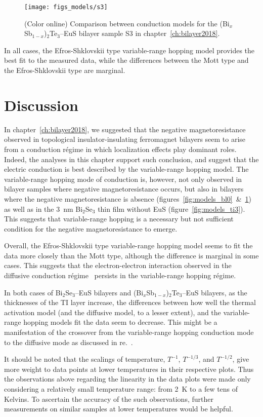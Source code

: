%
\begin{figure}[ht]%
    \centering%
    \texttt{[image: figs\_models/s3]}%
    \caption[Conduction model comparison: (Bi$_x$Sb$_{1-x}$)$_2$Te$_3$--EuS bilayer: S3]{\label{fig:models_s3}(Color online) Comparison between conduction models for the (Bi$_x$Sb$_{1-x}$)$_2$Te$_3$--EuS bilayer sample S3 in chapter~\ref{ch:bilayer2018}.}%
\end{figure}%

In all cases, the Efros-Shklovskii type variable-range hopping model provides the best fit to the measured data, while the differences between the Mott type and the Efros-Shklovskii type are marginal.

\FloatBarrier%
\section{Discussion}
In chapter~\ref{ch:bilayer2018}, we suggested that the negative magnetoresistance observed in topological insulator-insulating ferromagnet bilayers seem to arise from a conduction r\'egime in which localization effects play dominant roles. Indeed, the analyses in this chapter support such conclusion, and suggest that the electric conduction is best described by the variable-range hopping model. The variable-range hopping mode of conduction is, however, not only observed in bilayer samples where negative magnetoresistance occurs, but also in bilayers where the negative magnetoresistance is absence (figures~\ref{fig:models_bl0}~\&~\ref{fig:models_s3}) as well as in the \SI{3}{nm} Bi$_2$Se$_3$ thin film without EuS (figure~\ref{fig:models_ti3}). This suggests that variable-range hopping is a necessary but not sufficient condition for the negative magnetoresistance to emerge.

Overall, the Efros-Shklovskii type variable-range hopping model seems to fit the data more closely than the Mott type, although the difference is marginal in some cases. This suggests that the electron-electron interaction observed in the diffusive conduction r\'egime~\cite{Chen2011, Liu2011, Roy2013} persists in the variable-range hopping r\'egime.

In both cases of Bi$_2$Se$_3$--EuS bilayers and (Bi$_x$Sb$_{1-x}$)$_2$Te$_3$--EuS bilayers, as the thicknesses of the TI layer increase, the differences between how well the thermal activation model (and the diffusive model, to a lesser extent), and the variable-range hopping models fit the data seem to decrease. This might be a manifestation of the crossover from the variable-range hopping conduction mode to the diffusive mode as discussed in re.~\cite{liao2015}.

It should be noted that the scalings of temperature, $T^{-1}$, $T^{-1/3}$, and $T^{-1/2}$, give more weight to data points at lower temperatures in their respective plots. Thus the observations above regarding the linearity in the data plots were made only considering a relatively small temperature range: from \SI{2}{K} to a few tens of Kelvins. To ascertain the accuracy of the such observations, further measurements on similar samples at lower temperatures would be helpful.